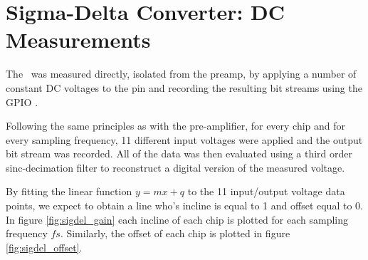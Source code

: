 \section{Sigma-Delta Converter: DC Measurements}
\label{sec:sigdelDC}

The \sdm~was measured directly, isolated from the preamp, by applying a number
of  constant  DC  voltages  to  the  pin  and  recording  the
resulting bit streams using the GPIO \raspi.

Following  the  same  principles as with the pre-amplifier, for every chip and
for every sampling frequency, 11 different input voltages were applied and the
output bit  stream  was  recorded.  All of the data was then evaluated using a
third order sinc-decimation filter to reconstruct a  digital  version  of  the
measured voltage.

By fitting the linear function $y=mx+q$ to  the  11  input/output voltage data
points, we expect to obtain a  line  who's  incline  is  equal to 1 and offset
equal to 0. In figure \ref{fig:sigdel_gain}  each  incline  of  each  chip  is
plotted for  each  sampling frequency $fs$. Similarly, the offset of each chip
is plotted in figure \ref{fig:sigdel_offset}.

